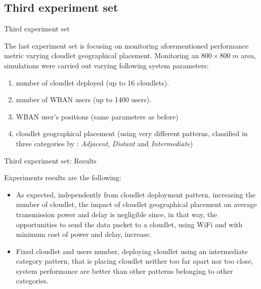 \documentclass[10pt]{beamer}
\begin{document}
\subsection{Third experiment set}
\begin{frame}{Third experiment set}

The last experiment set is focusing on monitoring aforementioned performance metric varying cloudlet geographical placement. Monitoring an $800 \times 800 \; m$ area, simulations were carried out varying following system parameters:

\begin{enumerate}
\item number of cloudlet deployed (up to 16 cloudlets).
\item number of WBAN users (up to 1400 users).
\item WBAN user's positions (same parameters as before)
\item cloudlet geographical placement (using very different patterns, classified in three categories by \citet{MSAReport}: \textit{Adjacent}, \textit{Distant} and \textit{Intermediate})
\end{enumerate}

\end{frame} 
\begin{frame}{Third experiment set: Results}

Experiments results are the following:

\begin{itemize}

\item As expected, independently from cloudlet deployment pattern, increasing the number of cloudlet, the impact of cloudlet geographical placement on average transmission power and delay is negligible since, in that way, the opportunities to send the data packet to a cloudlet, using WiFi and with minimum cost of power and delay, increase.

\item Fixed cloudlet and users number, deploying cloudlet using an intermediate category pattern, that is placing cloudlet neither too far apart nor too close, system performance are better than other patterns belonging to other categories.

\end{itemize}

\end{frame} 
\end{document}

